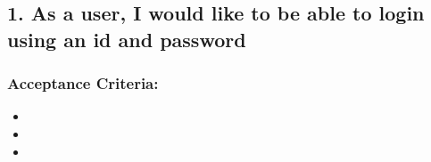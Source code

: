 \subsection*{1. As a user, I would like to be able to login using an id and password}


\subsubsection*{Acceptance Criteria:}

\begin{itemize}
\item 
\item 
\item 
\end{itemize}
